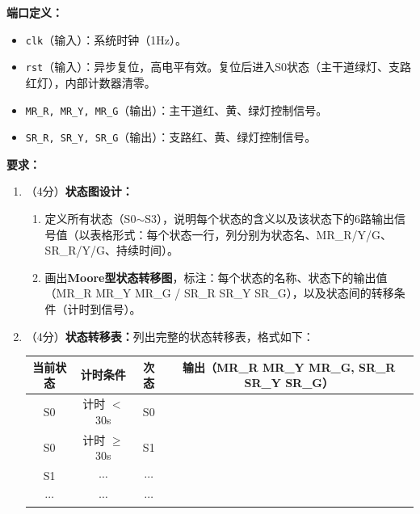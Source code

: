 \vspace{0.3cm}

\textbf{端口定义：}
\begin{itemize}
  \item \texttt{clk}（输入）：系统时钟（1Hz）。
  \item \texttt{rst}（输入）：异步复位，高电平有效。复位后进入S0状态（主干道绿灯、支路红灯），内部计数器清零。
  \item \texttt{MR\_R, MR\_Y, MR\_G}（输出）：主干道红、黄、绿灯控制信号。
  \item \texttt{SR\_R, SR\_Y, SR\_G}（输出）：支路红、黄、绿灯控制信号。
\end{itemize}

\vspace{0.3cm}

\textbf{要求：}
\begin{enumerate}[label=(\arabic*)]
  \item （4分）\textbf{状态图设计：}
  \begin{enumerate}
    \item 定义所有状态（S0$\sim$S3），说明每个状态的含义以及该状态下的6路输出信号值（以表格形式：每个状态一行，列分别为状态名、MR\_R/Y/G、SR\_R/Y/G、持续时间）。
    \item 画出\textbf{Moore型状态转移图}，标注：每个状态的名称、状态下的输出值（MR\_R MR\_Y MR\_G / SR\_R SR\_Y SR\_G），以及状态间的转移条件（计时到信号）。
  \end{enumerate}

  \item （4分）\textbf{状态转移表：}列出完整的状态转移表，格式如下：

  \begin{center}
  \begin{tabular}{|c|c|c|c|}
  \hline
  \textbf{当前状态} & \textbf{计时条件} & \textbf{次态} & \textbf{输出（MR\_R MR\_Y MR\_G, SR\_R SR\_Y SR\_G）} \\
  \hline
  S0 & 计时 $<$ 30s & S0 &  \\
  S0 & 计时 $\ge$ 30s & S1 &  \\
  S1 & $\cdots$ & $\cdots$ &  \\
  $\cdots$ & $\cdots$ & $\cdots$ &  \\
  \hline
  \end{tabular}
  \end{center}


\end{enumerate}
